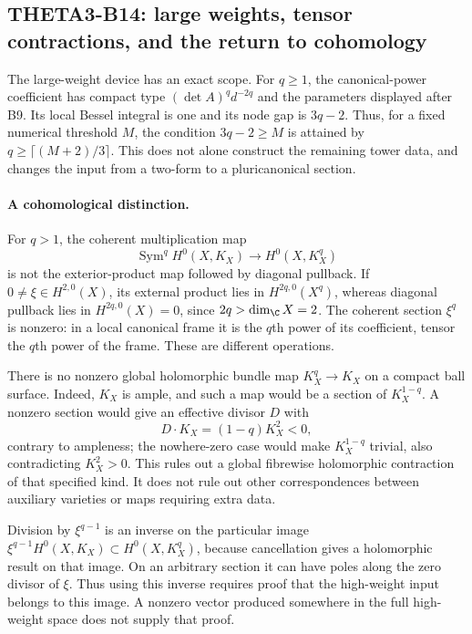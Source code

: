 \subsection{THETA3-B14: large weights, tensor contractions, and the return to cohomology}\label{B14}

The large-weight device has an exact scope. For $q\geq1$, the canonical-power coefficient has compact type $(\det A)^qd^{-2q}$ and the parameters displayed after B9. Its local Bessel integral is one and its node gap is $3q-2$. Thus, for a fixed numerical threshold $M$, the condition $3q-2\geq M$ is attained by $q\geq\lceil(M+2)/3\rceil$. This does not alone construct the remaining tower data, and changes the input from a two-form to a pluricanonical section.

\paragraph{A cohomological distinction.}
For $q>1$, the coherent multiplication map
\[
 \operatorname{Sym}^q H^0(X,K_X)\longrightarrow H^0(X,K_X^q)
\]
is not the exterior-product map followed by diagonal pullback. If
$0\ne\xi\in H^{2,0}(X)$, its external product lies in
$H^{2q,0}(X^q)$, whereas diagonal pullback lies in
$H^{2q,0}(X)=0$, since $2q>\dim_\C X=2$.
The coherent section $\xi^q$ is nonzero: in a local canonical frame it is the $q$th power of its coefficient, tensor the $q$th power of the frame. These are different operations.

There is no nonzero global holomorphic bundle map $K_X^q\to K_X$ on a compact ball surface. Indeed, $K_X$ is ample, and such a map would be a section of $K_X^{1-q}$. A nonzero section would give an effective divisor $D$ with
\[
 D\cdot K_X=(1-q)K_X^2<0,
\]
contrary to ampleness; the nowhere-zero case would make $K_X^{1-q}$ trivial, also contradicting $K_X^2>0$. This rules out a global fibrewise holomorphic contraction of that specified kind. It does not rule out other correspondences between auxiliary varieties or maps requiring extra data.

Division by $\xi^{q-1}$ is an inverse on the particular image
$\xi^{q-1}H^0(X,K_X)\subset H^0(X,K_X^q)$, because cancellation gives a holomorphic result on that image. On an arbitrary section it can have poles along the zero divisor of $\xi$. Thus using this inverse requires proof that the high-weight input belongs to this image. A nonzero vector produced somewhere in the full high-weight space does not supply that proof.

